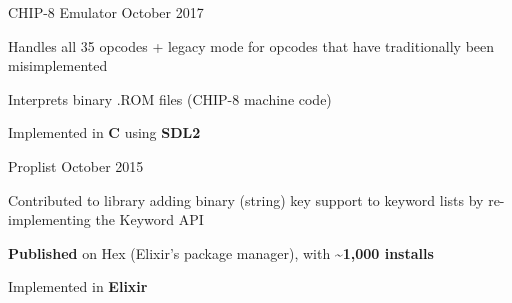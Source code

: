 \begin{cventries}
    \cventry
    {CHIP-8 Emulator} %
    {} %
    {}{October 2017}{
        \begin{cvitems} %
            \item {Handles all 35 opcodes + legacy mode for opcodes that have traditionally been misimplemented}
            \item {Interprets binary .ROM files (CHIP-8 machine code)}
            \item {Implemented in \textbf{C} using \textbf{SDL2}}
        \end{cvitems}
    }



    \cventry
    {Proplist} %
    {} %
    {}{October 2015}{
        \begin{cvitems} %
            \item {Contributed to library adding binary (string) key support to keyword lists by re-implementing the Keyword API}
            \item {\textbf{Published} on Hex (Elixir's package manager), with \textbf{\textasciitilde1,000 installs}}
            \item {Implemented in \textbf{Elixir}}
        \end{cvitems}
    }

\end{cventries}
